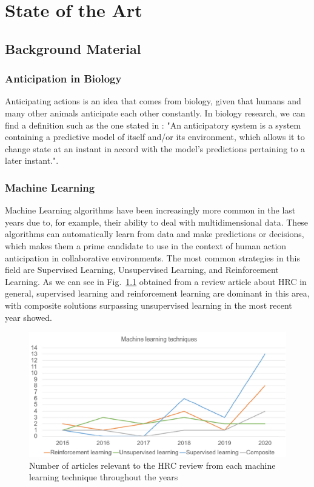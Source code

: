 \chapter{State of the Art}
\label{chapter:state_of_the_art}


\section{Background Material}

\subsection{Anticipation in Biology}

 Anticipating actions is an idea that comes from biology, given that humans and many other animals anticipate each other constantly. In biology research, we can find a definition such as the one stated in \cite{Rosen1985}: "An anticipatory system is a system containing a predictive model of itself and/or its environment, which allows it to change state at an instant in accord with the model's predictions pertaining to a later instant.".

\subsection{Machine Learning}

Machine Learning algorithms have been increasingly more common in the last years due to, for example, their ability to deal with multidimensional data. These algorithms can automatically learn from data and make predictions or decisions, which makes them a prime candidate to use in the context of human action anticipation in collaborative environments. The most common strategies in this field are Supervised Learning, Unsupervised Learning, and Reinforcement Learning. As we can see in Fig.~\ref{machinelearning} obtained from a review article about HRC in general, supervised learning and reinforcement learning are dominant in this area, with composite solutions surpassing unsupervised learning in the most recent year showed.

\begin{figure}[H]
\centerline{\includegraphics[width=6in]{figs/machinelearning.PNG}}
\caption{Number of articles relevant to the HRC review from each machine learning technique throughout the years\cite{Semeraro2023}}
\label{machinelearning}
\end{figure}

